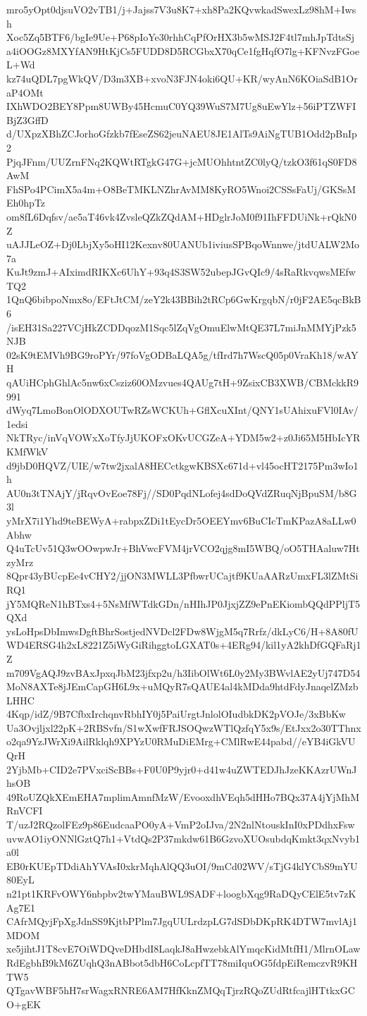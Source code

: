 mro5yOpt0djsuVO2vTB1/j+Jajss7V3u8K7+xh8Pa2KQvwkadSwexLz98hM+Iwsh
Xoc5Zq5BTF6/bgIe9Ue+P68pIoYe30rhhCqPfOrHX3b5wMSJ2F4tl7mhJpTdtsSj
a4iOOGz8MXYfAN9HtKjCs5FUDD8D5RCGbxX70qCe1fgHqfO7lg+KFNvzFGoeL+Wd
kz74uQDL7pgWkQV/D3m3XB+xvoN3FJN4oki6QU+KR/wyAnN6KOiaSdB1OraP4OMt
IXhWDO2BEY8Ppm8UWBy45HcmuC0YQ39WuS7M7Ug8uEwYlz+56iPTZWFIBjZ3GffD
d/UXpzXBhZCJorhoGfzkb7fEseZS62jeuNAEU8JE1AlTs9AiNgTUB1Odd2pBnIp2
PjqJFnm/UUZrnFNq2KQWtRTgkG47G+jcMUOhhtntZC0lyQ/tzkO3f61qS0FD8AwM
FhSPo4PCimX5a4m+O8BeTMKLNZhrAvMM8KyRO5Wnoi2CSSsFaUj/GKSsMEh0hpTz
om8fL6Dqfsv/ae5aT46vk4ZvsleQZkZQdAM+HDglrJoM0f91IhFFDUiNk+rQkN0Z
uAJJLeOZ+Dj0LbjXy5oHI12Kexnv80UANUb1iviusSPBqoWnnwe/jtdUALW2Mo7a
KuJt9zmJ+AIximdRIKXc6UhY+93q4S3SW52ubepJGvQIc9/4sRaRkvqwsMEfwTQ2
1QnQ6bibpoNmx8o/EFtJtCM/zeY2k43BBih2tRCp6GwKrgqbN/r0jF2AE5qcBkB6
/isEH31Sa227VCjHkZCDDqozM1Sqc5lZqVgOmuElwMtQE37L7miJnMMYjPzk5NJB
02sK9tEMVh9BG9roPYr/97foVgODBaLQA5g/tfIrd7h7WscQ05p0VraKh18/wAYH
qAUiHCphGhlAc5nw6xCsziz60OMzvues4QAUg7tH+9ZsixCB3XWB/CBMckkR9991
dWyq7LmoBonOlODXOUTwRZsWCKUh+GflXcuXInt/QNY1sUAhixuFVl0IAv/1edsi
NkTRyc/inVqVOWxXoTfyJjUKOFxOKvUCGZeA+YDM5w2+z0Ji65M5HbIcYRKMfWkV
d9jbD0HQVZ/UIE/w7tw2jxalA8HECctkgwKBSXc671d+vl45ocHT2175Pm3wIo1h
AU0n3tTNAjY/jRqvOvEoe78Fj//SD0PqdNLofej4sdDoQVdZRuqNjBpuSM/b8G3l
yMrX7i1Yhd9teBEWyA+rabpxZDi1tEycDr5OEEYmv6BuCIcTmKPazA8aLLw0Abhw
Q4uTcUv51Q3wOOwpwJr+BhVwcFVM4jrVCO2qjg8mI5WBQ/oO5THAaluw7HtzyMrz
8Qpr43yBUcpEe4vCHY2/jjON3MWLL3PfbwrUCajtf9KUaAARzUmxFL3lZMtSiRQ1
jY5MQReN1hBTxs4+5NsMfWTdkGDn/nHIhJP0JjxjZZ9ePnEKiombQQdPPljT5QXd
ysLoHpsDbImwsDgftBhrSostjedNVDcl2FDw8WjgM5q7Rrfz/dkLyC6/H+8A80fU
WD4ERSG4h2xL8221Z5iWyGiRihggtoLGXAT0s+4ERg94/kil1yA2khDfGQFaRj1Z
m709VgAQJ9zvBAxJpxqJbM23jfxp2u/h3IibOlWt6L0y2My3BWvlAE2yUj747D54
MoN8AXTe8jJEmCapGH6L9x+uMQyR7sQAUE4al4kMDda9htdFdyJnaqelZMzbLHHC
4Kqp/idZ/9B7CfbxIrchqnvRbhIY0j5PaiUrgtJnlolOIudbkDK2pVOJe/3xBbKw
Ua3Ovjljxl22pK+2RBSvfn/S1wXwfFRJSOQwzWTlQzfqY5x9s/EtJxx2o30TThnx
o2qa9YzJWrXi9AilRklqh9XPYzU0RMuDiEMrg+CMlRwE44pabd//eYB4iGkVUQrH
2YjbMb+CID2e7PVxciScBBs+F0U0P9yjr0+d41w4uZWTEDJhJzeKKAzrUWnJhsOB
49RoUZQkXEmEHA7mplimAmnfMzW/EvooxdhVEqh5dHHo7BQx37A4jYjMhMRnVCFI
T/uzJ2RQzolFEz9p86EudcaaPO0yA+VmP2oIJva/2N2nlNtouskInI0xPDdhxFsw
uvwAO1iyONNlGztQ7h1+VtdQs2P37mkdw61B6GzvoXUOsubdqKmkt3qxNvyb1a0l
EB0rKUEpTDdiAhYVAsI0xkrMqhAlQQ3uOI/9mCd02WV/sTjG4klYCbS9mYU80EyL
n21pt1KRFvOWY6nbpbv2twYMauBWL9SADF+loogbXqg9RaDQyCElE5tv7zKAg7E1
CAfrMQyjFpXgJdnSS9KjtbPPlm7JgqUULrdzpLG7dSDbDKpRK4DTW7mvlAj1MDOM
xe5jihtJ1T8cvE7OiWDQveDHbdI8LaqkJ8aHwzebkAlYmqcKidMtfH1/MlrnOLaw
RdEgbhB9kM6ZUqhQ3nABbot5dbH6CoLcpfTT78miIquOG5fdpEiRemczvR9KHTW5
QTgavWBF5hH7srWagxRNRE6AM7HfKknZMQqTjrzRQoZUdRtfcajlHTtkxGCO+gEK
